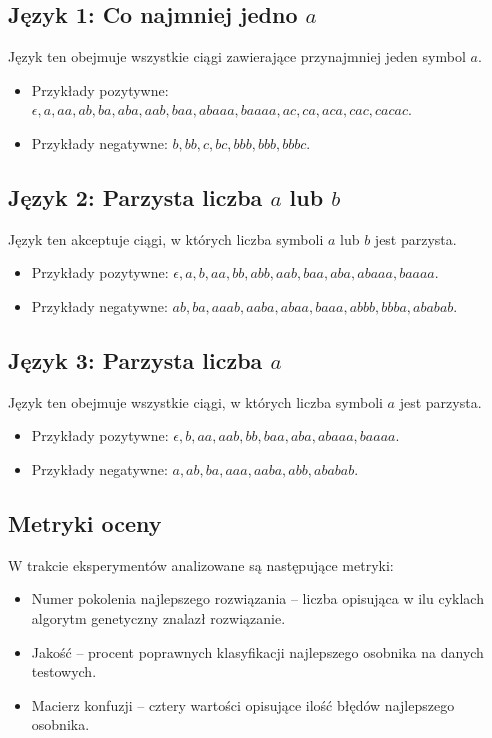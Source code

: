 \subsection{Język 1: Co najmniej jedno \( a \)}  
\label{sec:eksperyment4}
Język ten obejmuje wszystkie ciągi zawierające przynajmniej jeden symbol \( a \).  
\begin{itemize}  
    \item Przykłady pozytywne: \( \epsilon, a, aa, ab, ba, aba, aab, baa, abaaa, baaaa, ac, ca, aca, cac, cacac \).  
    \item Przykłady negatywne: \( b, bb, c, bc, bbb, bbb, bbbc \).  
\end{itemize}  

\subsection{Język 2: Parzysta liczba \( a \) lub \( b \)}  
\label{sec:eksperyment5}
Język ten akceptuje ciągi, w których liczba symboli \( a \) lub \( b \) jest parzysta.  
\begin{itemize}  
    \item Przykłady pozytywne: \( \epsilon, a, b, aa, bb, abb, aab, baa, aba, abaaa, baaaa \).  
    \item Przykłady negatywne: \( ab, ba, aaab, aaba, abaa, baaa, abbb, bbba, ababab \).  
\end{itemize}  

\subsection{Język 3: Parzysta liczba \( a \)}  
\label{sec:eksperyment6}
Język ten obejmuje wszystkie ciągi, w których liczba symboli \( a \) jest parzysta.  
\begin{itemize}  
    \item Przykłady pozytywne: \( \epsilon, b, aa, aab, bb, baa, aba, abaaa, baaaa \).  
    \item Przykłady negatywne: \( a, ab, ba, aaa, aaba, abb, ababab \).  
\end{itemize}

\subsection{Metryki oceny}  
W trakcie eksperymentów analizowane są następujące metryki:  
\begin{itemize}
    \item Numer pokolenia najlepszego rozwiązania -- liczba opisująca w ilu cyklach algorytm genetyczny znalazł rozwiązanie.
    \item Jakość -- procent poprawnych klasyfikacji najlepszego osobnika na danych testowych.
    \item Macierz konfuzji -- cztery wartości opisujące ilość błędów najlepszego osobnika.
\end{itemize}  

